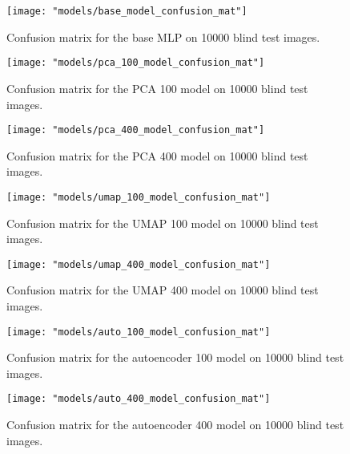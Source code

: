 \documentclass[conference]{IEEEtran}
\begin{document}
\begin{center}
	\begin{figure}[h!]
		\centering
		\texttt{[image: "models/base\_model\_confusion\_mat"]}
		\caption{Confusion matrix for the base MLP on 10000 blind test images.}
		\label{fig:base_model_confusion_mat}
	\end{figure}
\end{center}
\begin{center}
	\begin{figure}[h!]
		\centering
		\texttt{[image: "models/pca\_100\_model\_confusion\_mat"]}
		\caption{Confusion matrix for the PCA 100 model on 10000 blind test images.}
		\label{fig:pca_100_model_confusion_mat}
	\end{figure}
\end{center}
\begin{center}
	\begin{figure}[h!]
		\centering
		\texttt{[image: "models/pca\_400\_model\_confusion\_mat"]}
		\caption{Confusion matrix for the PCA 400 model on 10000 blind test images.}
		\label{fig:pca_400_model_confusion_mat}
	\end{figure}
\end{center}
\begin{center}
	\begin{figure}[h!]
		\centering
		\texttt{[image: "models/umap\_100\_model\_confusion\_mat"]}
		\caption{Confusion matrix for the UMAP 100 model on 10000 blind test images.}
		\label{fig:umap_100_model_confusion_mat}
	\end{figure}
\end{center}\begin{center}
	\begin{figure}[h!]
		\centering
		\texttt{[image: "models/umap\_400\_model\_confusion\_mat"]}
		\caption{Confusion matrix for the UMAP 400 model on 10000 blind test images.}
		\label{fig:umap_400_model_confusion_mat}
	\end{figure}
\end{center}
\begin{center}
	\begin{figure}[h!]
		\centering
		\texttt{[image: "models/auto\_100\_model\_confusion\_mat"]}
		\caption{Confusion matrix for the autoencoder 100 model on 10000 blind test images.}
		\label{fig:auto_100_model_confusion_mat}
	\end{figure}
\end{center}
\begin{center}
	\begin{figure}[h!]
		\centering
		\texttt{[image: "models/auto\_400\_model\_confusion\_mat"]}
		\caption{Confusion matrix for the autoencoder 400 model on 10000 blind test images.}
		\label{fig:auto_400_model_confusion_mat}
	\end{figure}
\end{center} 
\end{document}
